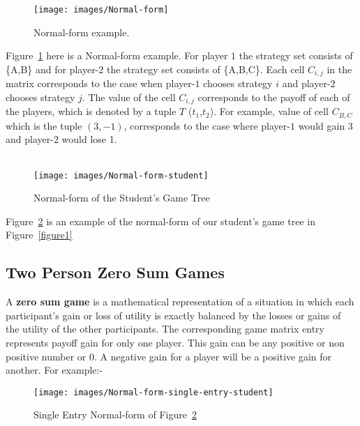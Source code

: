 \begin{figure}[h!]
\centering
\texttt{[image: images/Normal-form]}
\caption{Normal-form example.}
\label{figure2}
\end{figure}

Figure~\ref{figure2} here is a Normal-form example. For player $1$ the strategy set consists of \{A,B\} and for player-$2$ the strategy set consists of \{A,B,C\}. Each cell $C_{i,j}$ in the matrix corresponds to the case when player-$1$ chooses strategy $i$ and player-$2$ chooses strategy $j$. The value of the cell $C_{i,j}$ corresponds to the payoff of each of the players, which is denoted by a tuple $T$ ($t_1$,$t_2$). For example, value of cell $C_{B,C}$ which is the tuple $(3,-1)$, corresponds to the case where player-$1$ would gain $3$ and  player-$2$ would lose 1.\\\\
\begin{figure}[h!]
\centering
\texttt{[image: images/Normal-form-student]}
\caption{Normal-form of the Student's Game Tree}
\label{figure3}
\end{figure}
Figure~\ref{figure3} is an example of the normal-form of our student's game tree in Figure~\ref{figure1}
\subsection{Two Person Zero Sum Games}
A \textbf{zero sum game} is a mathematical representation of a situation in which each participant's gain or loss of utility is exactly balanced by the losses or gains of the utility of the other participants. The corresponding game matrix entry represents payoff gain for only one player. This gain can be any positive or non positive number or 0. A negative gain for a player will be a positive gain for another. For example:-

\begin{figure}[h!]
\centering
\texttt{[image: images/Normal-form-single-entry-student]}
\caption{Single Entry Normal-form of Figure~\ref{figure3}}
\label{figure4}
\end{figure}

